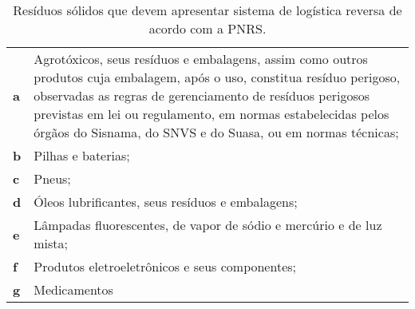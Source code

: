 \begin{table}[htbp]
  \centering
  \caption{Resíduos sólidos que devem apresentar sistema de logística reversa de acordo com a PNRS.}
    \begin{tabular}{P{3.5em}|p{25em}}
     \textbf{a} & Agrotóxicos, seus resíduos e embalagens, assim como outros produtos cuja embalagem, após o uso, constitua resíduo perigoso, observadas as regras de gerenciamento de resíduos perigosos previstas em lei ou regulamento, em normas estabelecidas pelos órgãos do Sisnama, do SNVS e do Suasa, ou em normas técnicas; \\
     \textbf{b} &       Pilhas e baterias; \\
     \textbf{c} & Pneus; \\
     \textbf{d} & Óleos lubrificantes, seus resíduos e embalagens; \\
     \textbf{e} & Lâmpadas fluorescentes, de vapor de sódio e mercúrio e de luz mista; \\
     \textbf{f} & Produtos eletroeletrônicos e seus componentes; \\
     \textbf{g} & Medicamentos \\
    \end{tabular}%
  \label{tab:logistica_reversa}%
\end{table}%
